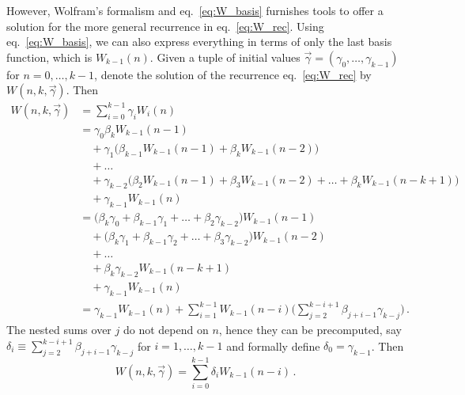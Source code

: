 \documentclass[review]{elsarticle}
\theoremstyle{plain}
\begin{document}
However, Wolfram's formalism \cite{Wolfram2000} and eq.~\eqref{eq:W_basis}
furnishes tools to offer a solution for the more general recurrence in eq.~\eqref{eq:W_rec}.
Using eq.~\eqref{eq:W_basis}, we can also express everything in terms of only the last basis function, which is $W_{k-1}(n)$.
Given a tuple of initial values $\vec{\gamma}=(\gamma_0,\dots,\gamma_{k-1})$ for $n=0,\dots,k-1$,
denote the solution of the recurrence eq.~\eqref{eq:W_rec} by $W(n,k,\vec{\gamma})$.
Then
\begin{equation}
\begin{split}
W(n,k,\vec{\gamma}) &= \sum_{i=0}^{k-1}\gamma_i W_i(n)
\\
&= \gamma_0 \beta_k W_{k-1}(n-1)
\\
&\quad
+\gamma_1 \bigl(\beta_{k-1}W_{k-1}(n-1) +\beta_kW_{k-1}(n-2)\bigr)
\\
&\quad
 +\dots
\\
&\quad
 +\gamma_{k-2} \bigl(\beta_2W_{k-1}(n-1) +\beta_3W_{k-1}(n-2) +\dots +\beta_kW_{k-1}(n-k+1)\bigr)
\\
&\quad
 +\gamma_{k-1} W_{k-1}(n)
\\
&= \bigl(\beta_k\gamma_0 +\beta_{k-1}\gamma_1 +\dots +\beta_2\gamma_{k-2}\bigr) W_{k-1}(n-1) 
\\
&\quad +\bigl(\beta_k\gamma_1 +\beta_{k-1}\gamma_2 +\dots +\beta_3\gamma_{k-2}\bigr) W_{k-1}(n-2)  
\\
&\quad +\dots
\\
&\quad +\beta_k\gamma_{k-2} W_{k-1}(n-k+1) 
\\
&\quad +\gamma_{k-1} W_{k-1}(n)
\\
&= \gamma_{k-1} W_{k-1}(n) +\sum_{i=1}^{k-1} W_{k-1}(n-i) \biggl(\sum_{j=2}^{k-i+1} \beta_{j+i-1}\gamma_{k-j}\biggr) \,.
\end{split}
\end{equation}
The nested sums over $j$ do not depend on $n$, hence they can be precomputed,
say $\delta_i \equiv \sum_{j=2}^{k-i+1} \beta_{j+i-1}\gamma_{k-j}$ for $i=1,\dots,k-1$
and formally define $\delta_0 = \gamma_{k-1}$. Then
\begin{equation}
W(n,k,\vec{\gamma}) = \sum_{i=0}^{k-1} \delta_i W_{k-1}(n-i) \,.
\end{equation}

\setcounter{equation}{0}
\end{document}
